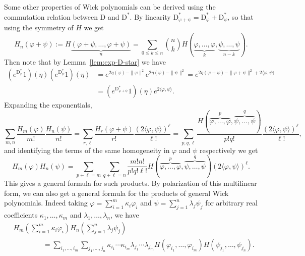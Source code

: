\documentclass[a4paper,11pt]{article}
\newcommand{\assign}{:=}
\newcommand{\mathD}{\mathrm{D}}
\begin{document}
Some other properties of Wick polynomials can be derived using the commutation
relation between $\mathD$ and $\mathD^{\ast}$. By linearity
$\mathD^{\ast}_{\varphi + \psi} = \mathD^{\ast}_{\varphi} +
\mathD^{\ast}_{\psi}$, so that using the symmetry of $H$ we get
\[ H_n (\varphi + \psi) \assign H \underbrace{(\varphi + \psi, \ldots, \varphi
   + \psi)}_n = \sum_{0 \leqslant k \leqslant n} \binom{n}{k} H
   (\underbrace{\varphi, \ldots, \varphi}_k, \underbrace{\psi, \ldots,
   \psi}_{n - k}) . \]
Then note that by Lemma~\ref{lem:exp-D-star} we have
\begin{align*}
  (e^{\mathD^{\ast}_{\varphi}} 1) (\eta) (e^{\mathD^{\ast}_{\psi}} 1) (\eta)& = e^{ 2\eta (\varphi) - \| \varphi \|^2} e^{2 \eta (\psi) - \| \psi \|^2} = e^{2 \eta (\varphi + \psi) - \| \varphi + \psi \|^2 + 2 \langle \varphi, \psi \rangle} \\
  & = (e^{\mathD^{\ast}_{\varphi + \psi}} 1) (\eta) e^{2 \langle \varphi, \psi \rangle}.
\end{align*}
Expanding the exponentials,
\[ \sum_{m, n}  \frac{H_m (\varphi)}{m!} \frac{H_n (\psi)}{n!} = \sum_{r,
   \ell} \frac{H_r (\varphi + \psi)}{r!} \frac{\left(2\langle
   \varphi, \psi \rangle \right)^{\ell}}{\ell !} = \sum_{p, q, \ell} \frac{H
   (\overbrace{\varphi, \ldots, \varphi}^p, \overbrace{\psi, \ldots,
   \psi}^q)}{p!q!} \frac{\left( 2 \langle \varphi, \psi \rangle
   \right)^{\ell}}{\ell !}, \]
and identifying the terms of the same homogeneity in $\varphi$ and $\psi$
respectively we get
\begin{equation}
  \label{eq:wick polynomial product} H_m (\varphi) H_n (\psi) = \sum_{p + \ell
  = m} \sum_{q + \ell = n} \frac{m!n!}{p!q! \ell !} H (\overbrace{\varphi,
  \ldots, \varphi}^p, \overbrace{\psi, \ldots, \psi}^q) \left( 2
  \langle \varphi, \psi \rangle \right)^{\ell} .
\end{equation}
This gives a general formula for such products. By polarization of this
multilinear form, we can also get a general formula for the products of
general Wick polynomials. Indeed taking $\varphi = \sum_{i = 1}^m \kappa_i
\varphi_i$ and $\psi = \sum_{j = 1}^n \lambda_j \psi_j$ for arbitrary real
coefficients $\kappa_1, \ldots, \kappa_m$ and $\lambda_1, \ldots, \lambda_n$,
we have
\begin{align*}
    &H_m (\sum_{i = 1}^m \kappa_i \varphi_i) H_n (\sum_{j = 1}^n \lambda_j \psi_j) \\
    &\hspace{50pt} = \sum_{i_1, \ldots, i_m} \sum_{j_1, \ldots, j_n} \kappa_{i_1} \cdots \kappa_{i_m} \lambda_{j_1} \cdots \lambda_{j_m} H (\varphi_{i_1}, \ldots, \varphi_{i_m}) H (\psi_{j_1}, \ldots, \psi_{j_n}).
\end{align*}
\end{document}
